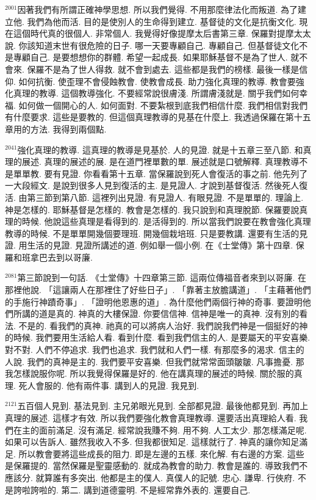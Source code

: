 \documentclass{book}
\begin{document}
$^{2001}$因著我們有所謂正確神學思想.
所以我們覺得.
不用那麼律法化而叛道.
為了建立他.
我們為他而活.
目的是使別人的生命得到建立.
基督徒的文化是抗衡文化.
現在這個時代真的很個人.
非常個人.
我覺得好像提摩太后書第三章.
保羅對提摩太太說.
你該知道末世有很危險的日子.
哪一天要專顧自己.
專顧自己.
但基督徒文化不是專顧自己.
是要想想你的群體.
希望一起成長.
如果耶穌基督不是為了世人.
就不會來.
保羅不是為了世人得救.
就不會到處去.
這些都是我們的榜樣.
最後一樣是信仰.
如何抗衡.
使歪理不會侵蝕教會.
使教會成長.
助力強化真理的教導.
教會要強化真理的教導.
這個教導強化.
不要經常說很膚淺.
所謂膚淺就是.
關乎我們如何幸福.
如何做一個開心的人.
如何面對.
不要紮根到底我們相信什麼.
我們相信對我們有什麼要求.
這些是要教的.
但這個真理教導的見基在什麼上.
我透過保羅在第十五章用的方法.
我得到兩個點.

$^{2041}$強化真理的教導.
這真理的教導是見基於.
人的見證.
就是十五章三至八節.
和真理的展述.
真理的展述的展.
是在道門裡單數的單.
展述就是口號解釋.
真理教導不是單單教.
要有見證.
你看看第十五章.
當保羅說到死人會復活的事之前.
他先列了一大段經文.
是說到很多人見到復活的主.
是見證人.
才說到基督復活.
然後死人復活.
由第三節到第八節.
這裡列出見證.
有見證人.
有眼見證.
不是單單的.
理論上.
神是怎樣的.
耶穌基督是怎樣的.
教會是怎樣的.
我只說到和真理脫節.
保羅要說真理的時候.
他說這些真理是看得到的.
是活得到的.
所以當我們說要在教會強化真理教導的時候.
不是單單開幾個要理班.
開幾個栽培班.
只是要教講.
還要有生活的見證.
用生活的見證.
見證所講述的道.
例如舉一個小例.
在《士堂傳》第十四章.
保羅和班拿巴去到以哥廉.

$^{2081}$第三節說到一句話.
《士堂傳》十四章第三節.
這兩位傳福音者來到以哥廉.
在那裡他說.
「這讓兩人在那裡住了好些日子」.
「靠著主放膽講道」.
「主藉著他們的手施行神蹟奇事」.
「證明他恩惠的道」.
為什麼他們兩個行神的奇事.
要證明他們所講的道是真的.
神真的大樓保證.
你要信信神.
信神是唯一的真神.
沒有別的看法.
不是的.
看我們的真神.
祂真的可以將病人治好.
我們說我們神是一個挺好的神的時候.
我們要用生活給人看.
看到什麼.
看到我們信主的人.
是要屬天的平安喜樂.
對不對.
人們不停追求.
我們也追求.
我們就和人們一樣.
有那麼多的渴求.
信主的人說.
我們的真神是主的.
我們要平安喜樂.
但我們就常常面頭皺皺.
凡事擔憂.
那我怎樣說服你呢.
所以我覺得保羅是好的.
他在講真理的展述的時候.
關於服的真理.
死人會服的.
他有兩件事.
講到人的見證.
我見到.

$^{2121}$五百個人見到.
基法見到.
主兄弟眼光見到.
全部都見證.
最後他都見到.
再加上真理的展述.
這樣才有效.
所以我們要強化教會真理教導.
還要活出真理給人看.
我們在主的面前滿足.
沒有滿足.
經常說我賺不夠.
用不夠.
人工太少.
那怎樣滿足呢.
如果可以告訴人.
雖然我收入不多.
但我都很知足.
這樣就行了.
神真的讓你知足滿足.
所以教會要將這些成長的阻力.
即是左邊的五樣.
來化解.
有右邊的方案.
這些是保羅提的.
當然保羅是聖靈感動的.
就成為教會的助力.
教會是誰的.
導致我們不應該分.
就算誰有多突出.
他都是主的僕人.
真僕人的記號.
忠心.
謙卑.
行俠府.
不是誇啦誇啦的.
第二.
講到道德靈明.
不是經常靠外表的.
還要自己.
\end{document}

